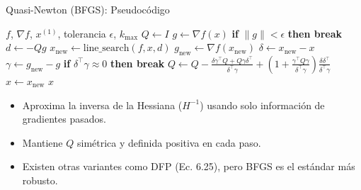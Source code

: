 \begin{frame}{Quasi-Newton (BFGS): Pseudocódigo}
    \scriptsize
    \begin{algorithmic}[1]
        \Require $f$, $\nabla f$, $x^{(1)}$, tolerancia $\epsilon$, $k_{\max}$
        \State $Q \gets I$ 
            \State $g \gets \nabla f(x)$
            \State \textbf{if} $\lVert g \rVert < \epsilon$ \textbf{then break}
            \State $d \gets -Q g$ 
            \State $x_{\text{new}} \gets \text{line\_search}(f, x, d)$ 
            \State $g_{\text{new}} \gets \nabla f(x_{\text{new}})$
            \State $\delta \gets x_{\text{new}} - x$ 
            \State $\gamma \gets g_{\text{new}} - g$ 
            \State \textbf{if} $\delta^\top \gamma \approx 0$ \textbf{then break} 
            \State $Q \gets Q - \frac{\delta\gamma^\top Q + Q\gamma\delta^\top}{\delta^\top\gamma} + \left(1 + \frac{\gamma^\top Q\gamma}{\delta^\top\gamma}\right)\frac{\delta\delta^\top}{\delta^\top\gamma}$ 
            \State $x \gets x_{\text{new}}$
        \EndFor
        \State \Return $x$
    \end{algorithmic}

    \vspace{1em}
    \scriptsize
    \begin{itemize}
        \item Aproxima la inversa de la Hessiana ($H^{-1}$) usando solo información de gradientes pasados.
        \item Mantiene $Q$ simétrica y definida positiva en cada paso.
        \item Existen otras variantes como DFP (Ec. 6.25), pero BFGS es el estándar más robusto.
    \end{itemize}
\end{frame}

